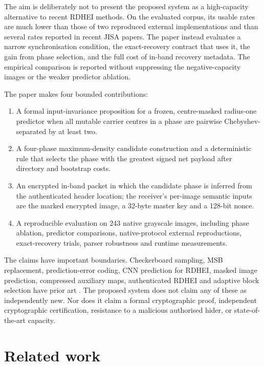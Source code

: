\documentclass[preprint,12pt,a4paper]{elsarticle}
\newcommand{\ProposedSystem}{the proposed system\xspace}
\begin{document}
The aim is deliberately not to present \ProposedSystem as a high-capacity alternative to recent RDHEI methods. On the evaluated corpus, its usable rates are much lower than those of two reproduced external implementations and than several rates reported in recent JISA papers. The paper instead evaluates a narrow synchronisation condition, the exact-recovery contract that uses it, the gain from phase selection, and the full cost of in-band recovery metadata. The empirical comparison is reported without suppressing the negative-capacity images or the weaker predictor ablation.

The paper makes four bounded contributions:
\begin{enumerate}[leftmargin=*,itemsep=2pt]
\item A formal input-invariance proposition for a frozen, centre-masked radius-one predictor when all mutable carrier centres in a phase are pairwise Chebyshev-separated by at least two.
\item A four-phase maximum-density candidate construction and a deterministic rule that selects the phase with the greatest signed net payload after directory and bootstrap costs.
\item An encrypted in-band packet in which the candidate phase is inferred from the authenticated header location; the receiver's per-image semantic inputs are the marked encrypted image, a 32-byte master key and a 128-bit nonce.
\item A reproducible evaluation on 243 native grayscale images, including phase ablation, predictor comparisons, native-protocol external reproductions, exact-recovery trials, parser robustness and runtime measurements.
\end{enumerate}

The claims have important boundaries. Checkerboard sampling, MSB replacement, prediction-error coding, CNN prediction for RDHEI, masked image prediction, compressed auxiliary maps, authenticated RDHEI and adaptive block selection have prior art \cite{yi2018,puteaux2018,yin2020,yin2021,ren2023,sui2023,ping2024,ren2025auth,ankur2025,huang2025bfe,ren2026abpde}. The proposed system does not claim any of these as independently new. Nor does it claim a formal cryptographic proof, independent cryptographic certification, resistance to a malicious authorised hider, or state-of-the-art capacity.

\section{Related work}
\label{sec:related}
\end{document}

